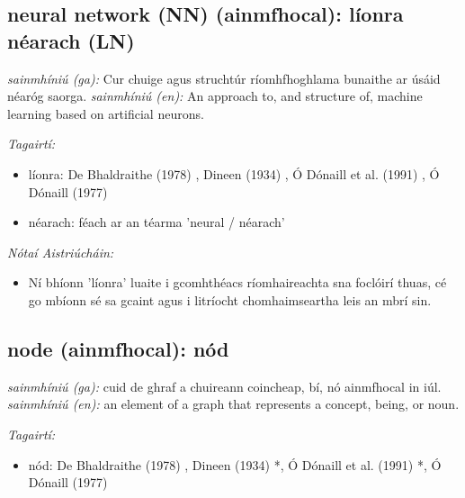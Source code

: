 \documentclass{article}
\begin{document}
\subsection*{neural network (NN) (ainmfhocal): líonra néarach (LN)} 
 \noindent \textit{sainmhíniú (ga):} Cur chuige agus struchtúr ríomhfhoghlama bunaithe ar úsáid néaróg saorga.
\newline\newline
 \noindent \textit{sainmhíniú (en):} An approach to, and structure of, machine learning based on artificial neurons.
\newline

 \noindent \textit{Tagairtí:}
\begin{itemize}
	\item líonra: De Bhaldraithe (1978) \cite{de-bhaldraithe}, Dineen (1934) \cite{dineen}, Ó Dónaill et al. (1991) \cite{focloir-beag}, Ó Dónaill (1977) \cite{odonaill}
	\item néarach: féach ar an téarma 'neural / néarach'
\end{itemize}

 \noindent \textit{Nótaí Aistriúcháin:}
\begin{itemize}
	\item Ní bhíonn 'líonra' luaite i gcomhthéacs ríomhaireachta sna foclóirí thuas, cé go mbíonn sé sa gcaint agus i litríocht chomhaimseartha leis an mbrí sin.
\end{itemize}


\subsection*{node (ainmfhocal): nód} 
 \noindent \textit{sainmhíniú (ga):} cuid de ghraf a chuireann coincheap, bí, nó ainmfhocal in iúl.
\newline\newline
 \noindent \textit{sainmhíniú (en):} an element of a graph that represents a concept, being, or noun.
\newline

 \noindent \textit{Tagairtí:}
\begin{itemize}
	\item nód: De Bhaldraithe (1978) \cite{de-bhaldraithe}, Dineen (1934) \cite{dineen}*, Ó Dónaill et al. (1991) \cite{focloir-beag}*, Ó Dónaill (1977) \cite{odonaill}
\end{itemize}
\end{document}
